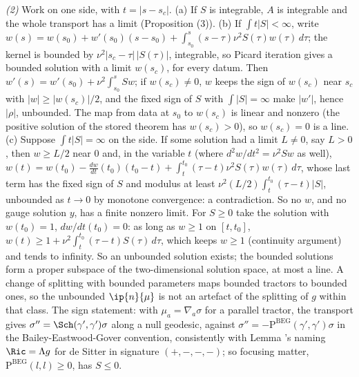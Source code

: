 \emph{(2)} Work on one side, with $t = |s - s_c|$. (a) If $S$ is integrable, $A$ is integrable and the whole transport has a limit (Proposition (3)). (b) If $\int t|S| < \infty$, write $w(s) = w(s_0) + w'(s_0)(s - s_0) + \int_{s_0}^{s}(s - \tau)\nu^2 S(\tau) w(\tau)\,d\tau$; the kernel is bounded by $\nu^2|s_c - \tau|\,|S(\tau)|$, integrable, so Picard iteration gives a bounded solution with a limit $w(s_c)$, for every datum. Then $w'(s) = w'(s_0) + \nu^2\int_{s_0}^{s} S w$; if $w(s_c) \neq 0$, $w$ keeps the sign of $w(s_c)$ near $s_c$ with $|w| \ge |w(s_c)|/2$, and the fixed sign of $S$ with $\int|S| = \infty$ make $|w'|$, hence $|\rho|$, unbounded. The map from data at $s_0$ to $w(s_c)$ is linear and nonzero (the positive solution of the stored theorem has $w(s_c) > 0$), so $w(s_c) = 0$ is a line. (c) Suppose $\int t|S| = \infty$ on the side. If some solution had a limit $L \neq 0$, say $L > 0$, then $w \ge L/2$ near $0$ and, in the variable $t$ (where $d^2w/dt^2 = \nu^2 S w$ as well), $w(t) = w(t_0) - \tfrac{dw}{dt}(t_0)(t_0 - t) + \int_t^{t_0}(\tau - t)\nu^2 S(\tau) w(\tau)\,d\tau$, whose last term has the fixed sign of $S$ and modulus at least $\nu^2(L/2)\int_t^{t_0}(\tau - t)|S|$, unbounded as $t \to 0$ by monotone convergence: a contradiction. So no $w$, and no gauge solution $y$, has a finite nonzero limit. For $S \ge 0$ take the solution with $w(t_0) = 1$, $dw/dt(t_0) = 0$: as long as $w \ge 1$ on $[t, t_0]$, $w(t) \ge 1 + \nu^2\int_t^{t_0}(\tau - t)S(\tau)\,d\tau$, which keeps $w \ge 1$ (continuity argument) and tends to infinity. So an unbounded solution exists; the bounded solutions form a proper subspace of the two-dimensional solution space, at most a line. A change of splitting with bounded parameters maps bounded tractors to bounded ones, so the unbounded $\ip{n}{\mu}$ is not an artefact of the splitting of $g$ within that class. The sign statement: with $\mu_a = \nabla_a\sigma$ for a parallel tractor, the transport gives $\sigma'' = \Sch(\gamma',\gamma')\sigma$ along a null geodesic, against $\sigma'' = -\mathrm{P}^{\mathrm{BEG}}(\gamma',\gamma')\sigma$ in the Bailey-Eastwood-Gover convention, consistently with Lemma 's naming $\Ric = \Lambda g$ for de Sitter in signature $(+,-,-,-)$; so focusing matter, $\mathrm{P}^{\mathrm{BEG}}(l, l) \ge 0$, has $S \le 0$.

